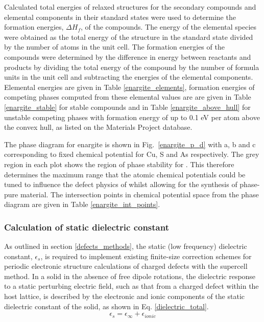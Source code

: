 \documentclass[11pt, twoside]{report}
\begin{document}
Calculated total energies of relaxed structures for the secondary compounds and elemental components in their standard states were used to determine the formation energies, $\Delta H_f$, of the compounds.
The energy of the elemental species were obtained as the total energy of the structure in the standard state divided by the number of atoms in the unit cell. The formation energies of the compounds were determined by the difference in energy between reactants and products by dividing the total energy of the compound by the number of formula units in the unit cell and subtracting the energies of the elemental components.
Elemental energies are given in Table \ref{enargite_elements}, formation energies of competing phases computed from these elemental values are are given in Table \ref{enargite_stable} for stable compounds and in Table \ref{enargite_above_hull} for unstable competing phases with formation energy of up to 0.1 eV per atom above the convex hull, as listed on the Materials Project database.

The phase diagram for enargite is shown in Fig.~\ref{enargite_p_d} with a, b and c corresponding to fixed chemical potential for Cu, S and As respectively. The grey region in each plot shows the region of phase stability for {\enargite}. This therefore determines the maximum range that the atomic chemical potentials could be tuned to influence the defect physics of {\enargite} whilst allowing for the synthesis of phase-pure material. The intersection points in chemical potential space from the {\enargite} phase diagram are given in Table \ref{enargite_int_points}.



\subsubsection{Calculation of static dielectric constant}

As outlined in section \ref{defects_methods}, the static (low frequency) dielectric constant, $\epsilon_s$, is required to implement existing finite-size correction schemes for periodic electronic structure calculations of charged defects with the supercell method. 
In a solid in the absence of free dipole rotations, the dielectric response to a static perturbing electric field, such as that from a charged defect within the host lattice, is described by the electronic and ionic components of the static dielectric constant of the solid, as shown in Eq. \ref{dielectric_total}. 
\begin{equation} \label{dielectric_total}
\epsilon_s = \epsilon_{\infty} + \epsilon_{ionic}
\end{equation}
\end{document}
